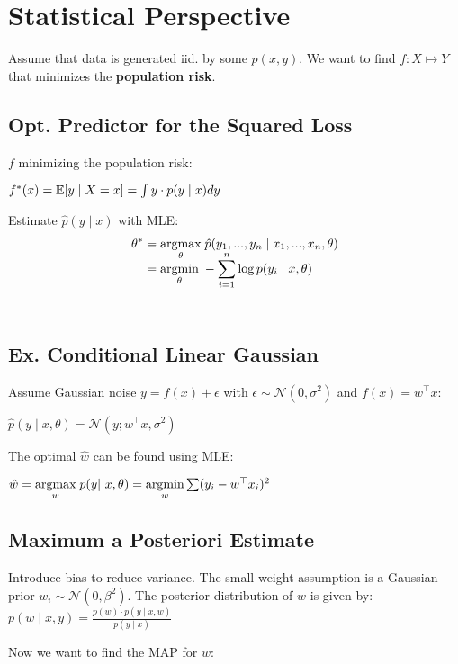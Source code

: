 \section*{Statistical Perspective}

Assume that data is generated iid. by some $p(x, y)$. We want to find $f: X \mapsto Y$ that minimizes the \textbf{population risk}.

\subsection*{Opt. Predictor for the Squared Loss}

$f$ minimizing the population risk:

\qquad $f^*(x) = \mathbb{E}[y \; | \; X = x] = \int y \cdot p(y \; | \; x) dy$

Estimate $\hat{p}(y \; | \; x)$ with MLE:
\begin{align*}
	\theta^* &= \underset{\theta}{\text{argmax}} \; \hat{p}(y_1, ..., y_n \; | \; x_1, ..., x_n, \theta) \\[-10pt]
	&= \underset{\theta}{\text{argmin}} \; - \sum_{i=1}^n \log p(y_i \; | \; x, \theta) 
\end{align*} \\[-15pt]

\subsection*{Ex. Conditional Linear Gaussian}

Assume Gaussian noise $y = f(x) + \epsilon$ with $\epsilon \sim \mathcal{N}(0, \sigma^2)$ and $f(x) = w^\top x$:

\qquad \qquad $\hat p(y \; | \; x, \theta) = \mathcal{N}(y; w^\top x, \sigma^2)$

The optimal $\hat w$ can be found using MLE:

$\hat w = \argmax{w} \; p(y | x, \theta) =\argmin{w} \sum (y_i - w^\top x_i)^2$

\subsection*{Maximum a Posteriori Estimate}

Introduce bias to reduce variance. The small weight assumption is a Gaussian prior $w_i \sim \mathcal{N}(0, \beta^2)$. The posterior distribution of $w$ is given by:
$p(w \; | \; x, y) = \frac{p(w) \cdot p( y \; | \; x, w)}{p( y \; | \; x)}$

Now we want to find the MAP for $w$:

